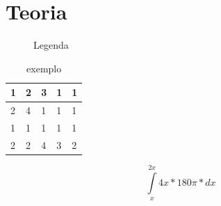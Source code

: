 \section{Teoria}
\lipsum[1]
\begin{figure}[h]
	\caption{Legenda}
	\label{fig:placeholder.jpg}
\end{figure}
\begin{table}[h]
	\centering
	\caption{exemplo}
	\label{my-label}
	\begin{tabular}{|l|l|l|l|l|}
		\hline 1 & 2 & 3 & 1 & 1 \\
		\hline 2 & 4 & 1 & 1 & 1 \\
		\hline 1 & 1 & 1 & 1 & 1 \\
		\hline 2 & 2 & 4 & 3 & 2 \\
		\hline
	\end{tabular}
\end{table}
\begin{center}
	\begin{equation}
	\int\limits_{x}^{2x} 4x*180\pi*dx
	\end{equation}
\end{center}